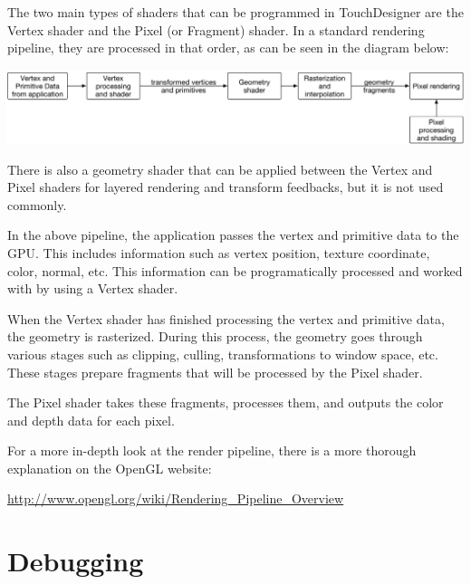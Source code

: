 \begin{fullwidth}
The two main types of shaders that can be programmed in TouchDesigner are the Vertex shader and the Pixel (or Fragment) shader. In a standard rendering pipeline, they are processed in that order, as can be seen in the diagram below:

\begin{center}
\includegraphics{./img/12.2/pipeline.png}
\end{center}

There is also a geometry shader that can be applied between the Vertex and Pixel shaders for layered rendering and transform feedbacks, but it is not used commonly.

In the above pipeline, the application passes the vertex and primitive data to the GPU. This includes information such as vertex position, texture coordinate, color, normal, etc. This information can be programatically processed and worked with by using a Vertex shader.

When the Vertex shader has finished processing the vertex and primitive data, the geometry is rasterized. During this process, the geometry goes through various stages such as clipping, culling, transformations to window space, etc. These stages prepare fragments that will be processed by the Pixel shader.

The Pixel shader takes these fragments, processes them, and outputs the color and depth data for each pixel.

For a more in-depth look at the render pipeline, there is a more thorough explanation on the OpenGL website:

\url{http://www.opengl.org/wiki/Rendering_Pipeline_Overview}

\end{fullwidth}


\section{Debugging}

